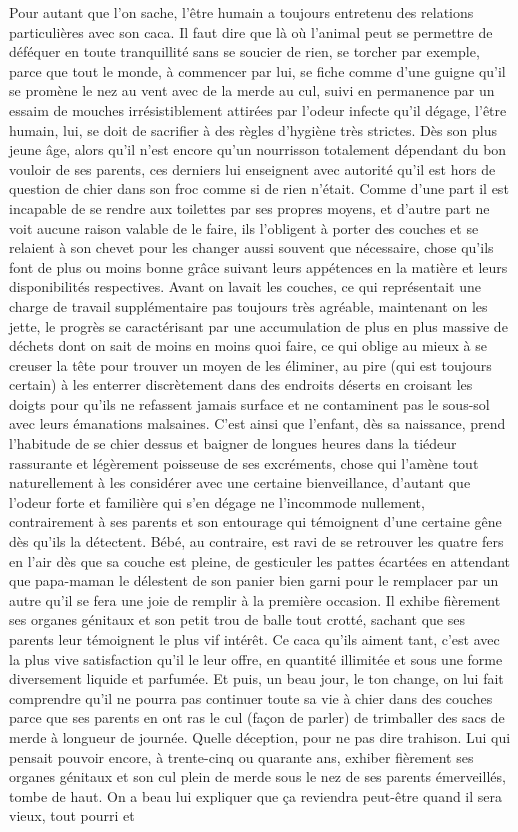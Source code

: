 Pour autant que l’on sache, l’être humain a toujours entretenu des relations particulières avec son caca. Il faut dire que là où l’animal peut se permettre de déféquer en toute tranquillité sans se soucier de rien, se torcher par exemple, parce que tout le monde, à commencer par lui, se fiche comme d’une guigne qu’il se promène le nez au vent avec de la merde au cul, suivi en permanence par un essaim de mouches irrésistiblement attirées par l’odeur infecte qu’il dégage, l’être humain, lui, se doit de sacrifier à des règles d’hygiène très strictes. Dès son plus jeune âge, alors qu’il n’est encore qu’un nourrisson totalement dépendant du bon vouloir de ses parents, ces derniers lui enseignent avec autorité qu’il est hors de question de chier dans son froc comme si de rien n’était. Comme d’une part il est incapable de se rendre aux toilettes par ses propres moyens, et d’autre part ne voit aucune raison valable de le faire, ils l’obligent à porter des couches et se relaient à son chevet pour les changer aussi souvent que nécessaire, chose qu’ils font de plus ou moins bonne grâce suivant leurs appétences en la matière et leurs disponibilités respectives. Avant on lavait les couches, ce qui représentait une charge de travail supplémentaire pas toujours très agréable, maintenant on les jette, le progrès se caractérisant par une accumulation de plus en plus massive de déchets dont on sait de moins en moins quoi faire, ce qui oblige au mieux à se creuser la tête pour trouver un moyen de les éliminer, au pire (qui est toujours certain) à les enterrer discrètement dans des endroits déserts en croisant les doigts pour qu’ils ne refassent jamais surface et ne contaminent pas le sous-sol avec leurs émanations malsaines. C’est ainsi que l’enfant, dès sa naissance, prend l’habitude de se chier dessus et baigner de longues heures dans la tiédeur rassurante et légèrement poisseuse de ses excréments, chose qui l’amène tout naturellement à les considérer avec une certaine bienveillance, d’autant que l’odeur forte et familière qui s’en dégage ne l’incommode nullement, contrairement à ses parents et son entourage qui témoignent d’une certaine gêne dès qu’ils la détectent. Bébé, au contraire, est ravi de se retrouver les quatre fers en l’air dès que sa couche est pleine, de gesticuler les pattes écartées en attendant que papa-maman le délestent de son panier bien garni pour le remplacer par un autre qu’il se fera une joie de remplir à la première occasion. Il exhibe fièrement ses organes génitaux et son petit trou de balle tout crotté, sachant que ses parents leur témoignent le plus vif intérêt. Ce caca qu’ils aiment tant, c’est avec la plus vive satisfaction qu’il le leur offre, en quantité illimitée et sous une forme diversement liquide et parfumée. Et puis, un beau jour, le ton change, on lui fait comprendre qu’il ne pourra pas continuer toute sa vie à chier dans des couches parce que ses parents en ont ras le cul (façon de parler) de trimballer des sacs de merde à longueur de journée. Quelle déception, pour ne pas dire trahison. Lui qui pensait pouvoir encore, à trente-cinq ou quarante ans, exhiber fièrement ses organes génitaux et son cul plein de merde sous le nez de ses parents émerveillés, tombe de haut. On a beau lui expliquer que ça reviendra peut-être quand il sera vieux, tout pourri et 